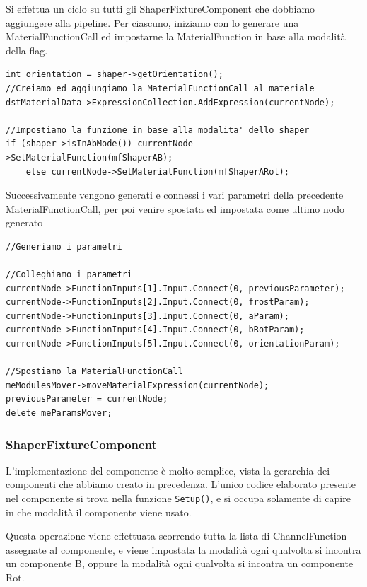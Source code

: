 \documentclass[main.tex]{subfiles}
\begin{document}
Si effettua un ciclo su tutti gli ShaperFixtureComponent che dobbiamo aggiungere alla pipeline. Per ciascuno, iniziamo con lo generare una MaterialFunctionCall ed impostarne la MaterialFunction in base alla modalità della flag.
\begin{lstlisting}
int orientation = shaper->getOrientation();
//Creiamo ed aggiungiamo la MaterialFunctionCall al materiale
dstMaterialData->ExpressionCollection.AddExpression(currentNode);

//Impostiamo la funzione in base alla modalita' dello shaper
if (shaper->isInAbMode()) currentNode->SetMaterialFunction(mfShaperAB);
    else currentNode->SetMaterialFunction(mfShaperARot);
\end{lstlisting}
Successivamente vengono generati e connessi i vari parametri della precedente MaterialFunctionCall, per poi venire spostata ed impostata come ultimo nodo generato
\begin{lstlisting}
//Generiamo i parametri

//Colleghiamo i parametri
currentNode->FunctionInputs[1].Input.Connect(0, previousParameter);
currentNode->FunctionInputs[2].Input.Connect(0, frostParam);
currentNode->FunctionInputs[3].Input.Connect(0, aParam);
currentNode->FunctionInputs[4].Input.Connect(0, bRotParam);
currentNode->FunctionInputs[5].Input.Connect(0, orientationParam);

//Spostiamo la MaterialFunctionCall
meModulesMover->moveMaterialExpression(currentNode);
previousParameter = currentNode;
delete meParamsMover;
\end{lstlisting}

\subsubsection{ShaperFixtureComponent}\label{subsec:5_1_ShaperFixtureComponent}
L'implementazione del componente è molto semplice, vista la gerarchia dei componenti che abbiamo creato in precedenza. L'unico codice elaborato presente nel componente si trova nella funzione \lstinline{Setup()}, e si occupa solamente di capire in che modalità il componente viene usato. 

Questa operazione viene effettuata scorrendo tutta la lista di ChannelFunction assegnate al componente, e viene impostata la modalità  ogni qualvolta si incontra un componente B, oppure la modalità  ogni qualvolta si incontra un componente Rot.
%
\end{document}
